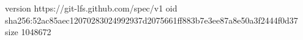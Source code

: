 version https://git-lfs.github.com/spec/v1
oid sha256:52ac85aec12070283024992937d2075661ff883b7e3ee87a8e50a3f2444f0d37
size 1048672
